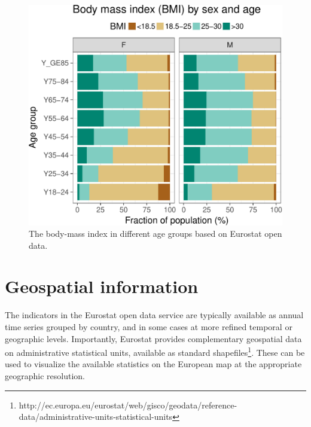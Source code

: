 \begin{figure}
\begin{center}
\includegraphics{2015-manu-bmi-1}
\end{center}
\caption{The body-mass index in different age groups based on Eurostat open data.}
\label{fig:bmi}
\end{figure}



\section{Geospatial information}

The indicators in the Eurostat open data service are typically
available as annual time series grouped by country, and in some cases
at more refined temporal or geographic levels. Importantly, Eurostat
provides complementary geospatial data on administrative statistical
units, available as standard
shapefiles\footnote{http://ec.europa.eu/eurostat/web/gisco/geodata/reference-data/administrative-units-statistical-units}. These
can be used to visualize the available statistics on the European map
at the appropriate geographic resolution.

